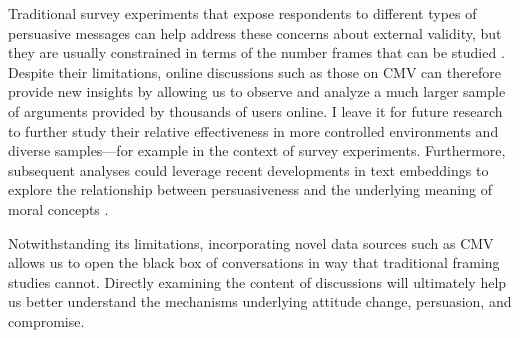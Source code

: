 Traditional survey experiments that expose respondents to different types of persuasive messages can help address these concerns about external validity, but they are usually constrained in terms of the number frames that can be studied \citep[see also][]{clifford2023generalizing}. Despite their limitations, online discussions such as those on CMV can therefore provide new insights by allowing us to observe and analyze a much larger sample of arguments provided by thousands of users online. I leave it for future research to further study their relative effectiveness in more controlled environments and diverse samples---for example in the context of survey experiments. Furthermore, subsequent analyses could leverage recent developments in text embeddings to explore the relationship between persuasiveness and the underlying meaning of moral concepts \citep{kraft2023lexical}. 

Notwithstanding its limitations, incorporating novel data sources such as CMV allows us to open the black box of conversations in way that traditional framing studies cannot. Directly examining the content of discussions will ultimately help us better understand the mechanisms underlying attitude change, persuasion, and compromise.


